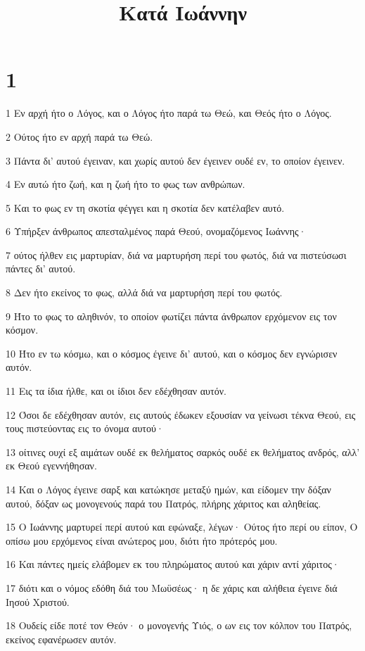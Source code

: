

\title{Κατά Ιωάννην}


\chapter{1}

\par 1 Εν αρχή ήτο ο Λόγος, και ο Λόγος ήτο παρά τω Θεώ, και Θεός ήτο ο Λόγος.
\par 2 Ούτος ήτο εν αρχή παρά τω Θεώ.
\par 3 Πάντα δι' αυτού έγειναν, και χωρίς αυτού δεν έγεινεν ουδέ εν, το οποίον έγεινεν.
\par 4 Εν αυτώ ήτο ζωή, και η ζωή ήτο το φως των ανθρώπων.
\par 5 Και το φως εν τη σκοτία φέγγει και η σκοτία δεν κατέλαβεν αυτό.
\par 6 Υπήρξεν άνθρωπος απεσταλμένος παρά Θεού, ονομαζόμενος Ιωάννης·
\par 7 ούτος ήλθεν εις μαρτυρίαν, διά να μαρτυρήση περί του φωτός, διά να πιστεύσωσι πάντες δι' αυτού.
\par 8 Δεν ήτο εκείνος το φως, αλλά διά να μαρτυρήση περί του φωτός.
\par 9 Ήτο το φως το αληθινόν, το οποίον φωτίζει πάντα άνθρωπον ερχόμενον εις τον κόσμον.
\par 10 Ήτο εν τω κόσμω, και ο κόσμος έγεινε δι' αυτού, και ο κόσμος δεν εγνώρισεν αυτόν.
\par 11 Εις τα ίδια ήλθε, και οι ίδιοι δεν εδέχθησαν αυτόν.
\par 12 Όσοι δε εδέχθησαν αυτόν, εις αυτούς έδωκεν εξουσίαν να γείνωσι τέκνα Θεού, εις τους πιστεύοντας εις το όνομα αυτού·
\par 13 οίτινες ουχί εξ αιμάτων ουδέ εκ θελήματος σαρκός ουδέ εκ θελήματος ανδρός, αλλ' εκ Θεού εγεννήθησαν.
\par 14 Και ο Λόγος έγεινε σαρξ και κατώκησε μεταξύ ημών, και είδομεν την δόξαν αυτού, δόξαν ως μονογενούς παρά του Πατρός, πλήρης χάριτος και αληθείας.
\par 15 Ο Ιωάννης μαρτυρεί περί αυτού και εφώναξε, λέγων· Ούτος ήτο περί ου είπον, Ο οπίσω μου ερχόμενος είναι ανώτερος μου, διότι ήτο πρότερός μου.
\par 16 Και πάντες ημείς ελάβομεν εκ του πληρώματος αυτού και χάριν αντί χάριτος·
\par 17 διότι και ο νόμος εδόθη διά του Μωϋσέως· η δε χάρις και αλήθεια έγεινε διά Ιησού Χριστού.
\par 18 Ουδείς είδε ποτέ τον Θεόν· ο μονογενής Υιός, ο ων εις τον κόλπον του Πατρός, εκείνος εφανέρωσεν αυτόν.
